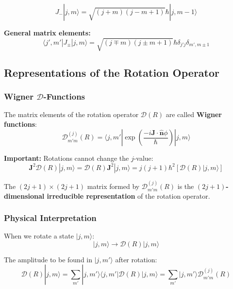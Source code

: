 \documentclass[11pt,a4paper]{article}
\begin{document}
\begin{equation}
\boxed{J_-|j, m\rangle = \sqrt{(j+m)(j-m+1)}\hbar|j, m-1\rangle}
\tag{3.192}
\end{equation}

\textbf{General matrix elements:}
\begin{equation}
\boxed{\langle j', m'|J_\pm|j, m\rangle = \sqrt{(j \mp m)(j \pm m + 1)}\hbar\delta_{j'j}\delta_{m', m\pm 1}}
\tag{3.193}
\end{equation}

\subsection{Representations of the Rotation Operator}

\subsubsection{Wigner $\mathscr{D}$-Functions}

The matrix elements of the rotation operator $\mathscr{D}(R)$ are called \textbf{Wigner functions}:
\begin{equation}
\boxed{\mathscr{D}_{m'm}^{(j)}(R) = \langle j, m'|\exp\left(\frac{-i\mathbf{J}\cdot\hat{\mathbf{n}}\phi}{\hbar}\right)|j, m\rangle}
\tag{3.194}
\end{equation}

\textbf{Important:} Rotations cannot change the $j$-value:
\begin{equation}
\mathbf{J}^2\mathscr{D}(R)|j, m\rangle = \mathscr{D}(R)\mathbf{J}^2|j, m\rangle = j(j+1)\hbar^2[\mathscr{D}(R)|j, m\rangle]
\tag{3.195}
\end{equation}

The $(2j+1) \times (2j+1)$ matrix formed by $\mathscr{D}_{m'm}^{(j)}(R)$ is the \textbf{$(2j+1)$-dimensional irreducible representation} of the rotation operator.

\subsubsection{Physical Interpretation}

When we rotate a state $|j, m\rangle$:
\begin{equation}
|j, m\rangle \to \mathscr{D}(R)|j, m\rangle
\tag{3.200}
\end{equation}

The amplitude to be found in $|j, m'\rangle$ after rotation:
\begin{equation}
\mathscr{D}(R)|j, m\rangle = \sum_{m'}|j, m'\rangle\langle j, m'|\mathscr{D}(R)|j, m\rangle = \sum_{m'}|j, m'\rangle\mathscr{D}_{m'm}^{(j)}(R)
\tag{3.201}
\end{equation}
\end{document}
